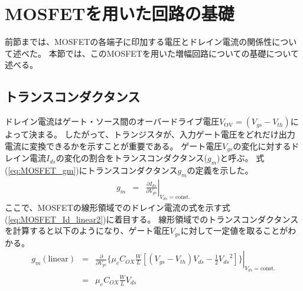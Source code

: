 \section{MOSFETを用いた回路の基礎}
	前節までは、MOSFETの各端子に印加する電圧とドレイン電流の関係性について述べた。
	本節では、このMOSFETを用いた増幅回路についての基礎について述べる。
	\subsection{トランスコンダクタンス}
		ドレイン電流はゲート・ソース間のオーバードライブ電圧$V_{\mathrm{OV}} = (V_{gs} - V_{th})$によって決まる。
		したがって、トランジスタが、入力ゲート電圧をどれだけ出力電流に変換できるかを示すことが重要である。
		ゲート電圧$V_{gs}$の変化に対するドレイン電流$I_{ds}$の変化の割合をトランスコンダクタンス($g_m$)と呼ぶ。
		式(\ref{eq:MOSFET_gm})にトランスコンダクタンス$g_m$の定義を示した。
		\begin{eqnarray}
			g_{m} & = & \left. \frac{\partial I_{ds}}{\partial V_{gs}} \right|_{V_{ds} = \mathrm{const.}}
			\label{eq:MOSFET_gm}
		\end{eqnarray}
		ここで、MOSFETの線形領域でのドレイン電流の式を示す式(\ref{eq:MOSFET_Id_linear2})に着目する。
		線形領域でのトランスコンダクタンスを計算すると以下のようになり、ゲート電圧$V_{gs}$に対して一定値を取ることがわかる。
		\begin{eqnarray}
			g_m (\mathrm{linear}) & = & \left. \frac{\partial}{\partial V_{gs}} \{ \mu_e C_{OX} \frac{W}{L} [ (V_{gs} - V_{th}) V_{ds} - \frac{1}{2} {V_{ds}}^2 ] \} \right|_{V_{ds} = \mathrm{const.}} \\
			& = & \mu_e C_{OX} \frac{W}{L} V_{ds}
		\end{eqnarray}
		
